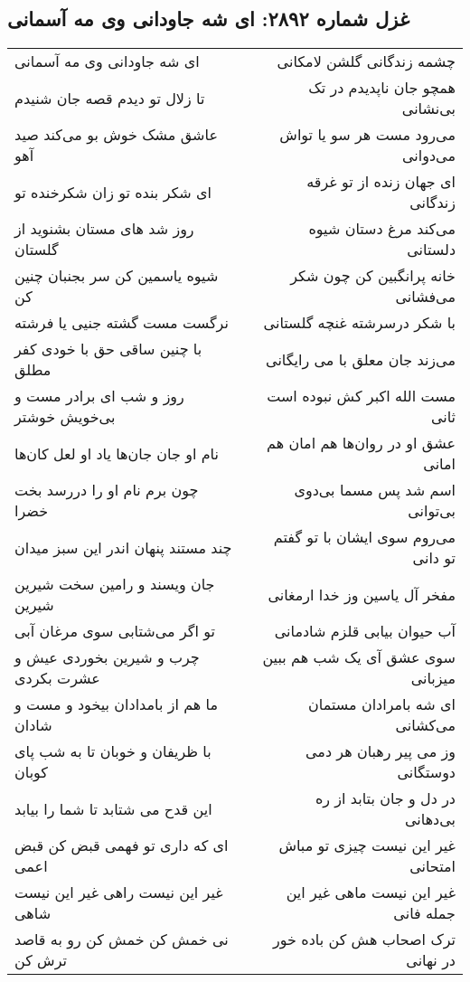 \begin{center}
\section*{غزل شماره ۲۸۹۲: ای شه جاودانی وی مه آسمانی}
\label{sec:2892}
\begin{longtable}{l p{0.5cm} r}
ای شه جاودانی وی مه آسمانی
&&
چشمه زندگانی گلشن لامکانی
\\
تا زلال تو دیدم قصه جان شنیدم
&&
همچو جان ناپدیدم در تک بی‌نشانی
\\
عاشق مشک خوش بو می‌کند صید آهو
&&
می‌رود مست هر سو یا تواش می‌دوانی
\\
ای شکر بنده تو زان شکرخنده تو
&&
ای جهان زنده از تو غرقه زندگانی
\\
روز شد های مستان بشنوید از گلستان
&&
می‌کند مرغ دستان شیوه دلستانی
\\
شیوه یاسمین کن سر بجنبان چنین کن
&&
خانه پرانگبین کن چون شکر می‌فشانی
\\
نرگست مست گشته جنیی یا فرشته
&&
با شکر درسرشته غنچه گلستانی
\\
با چنین ساقی حق با خودی کفر مطلق
&&
می‌زند جان معلق با می رایگانی
\\
روز و شب ای برادر مست و بی‌خویش خوشتر
&&
مست الله اکبر کش نبوده است ثانی
\\
نام او جان جان‌ها یاد او لعل کان‌ها
&&
عشق او در روان‌ها هم امان هم امانی
\\
چون برم نام او را دررسد بخت خضرا
&&
اسم شد پس مسما بی‌دوی بی‌توانی
\\
چند مستند پنهان اندر این سبز میدان
&&
می‌روم سوی ایشان با تو گفتم تو دانی
\\
جان ویسند و رامین سخت شیرین شیرین
&&
مفخر آل یاسین وز خدا ارمغانی
\\
تو اگر می‌شتابی سوی مرغان آبی
&&
آب حیوان بیابی قلزم شادمانی
\\
چرب و شیرین بخوردی عیش و عشرت بکردی
&&
سوی عشق آی یک شب هم ببین میزبانی
\\
ما هم از بامدادان بیخود و مست و شادان
&&
ای شه بامرادان مستمان می‌کشانی
\\
با ظریفان و خوبان تا به شب پای کوبان
&&
وز می پیر رهبان هر دمی دوستگانی
\\
این قدح می شتابد تا شما را بیابد
&&
در دل و جان بتابد از ره بی‌دهانی
\\
ای که داری تو فهمی قبض کن قبض اعمی
&&
غیر این نیست چیزی تو مباش امتحانی
\\
غیر این نیست راهی غیر این نیست شاهی
&&
غیر این نیست ماهی غیر این جمله فانی
\\
نی خمش کن خمش کن رو به قاصد ترش کن
&&
ترک اصحاب هش کن باده خور در نهانی
\\
\end{longtable}
\end{center}
